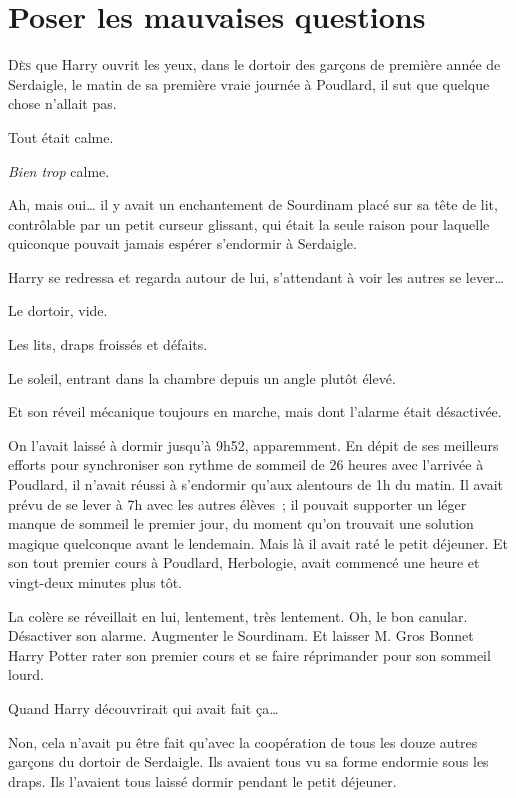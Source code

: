 
\chapter{Poser les mauvaises questions}

\lettrine{D}{ès} que Harry ouvrit les yeux, dans le dortoir des garçons de première année de Serdaigle, le matin de sa première vraie journée à Poudlard, il sut que quelque chose n'allait pas.

Tout était calme.

\emph{Bien trop} calme.

Ah, mais oui… il y avait un enchantement de Sourdinam placé sur sa tête de lit, contrôlable par un petit curseur glissant, qui était la seule raison pour laquelle quiconque pouvait jamais espérer s'endormir à Serdaigle.

Harry se redressa et regarda autour de lui, s'attendant à voir les autres se lever…

Le dortoir, vide.

Les lits, draps froissés et défaits.

Le soleil, entrant dans la chambre depuis un angle plutôt élevé.

Et son réveil mécanique toujours en marche, mais dont l'alarme était désactivée.

On l'avait laissé à dormir jusqu'à 9h52, apparemment.
En dépit de ses meilleurs efforts pour synchroniser son rythme de sommeil de 26 heures avec l'arrivée à Poudlard, il n'avait réussi à s'endormir qu'aux alentours de 1h du matin.
Il avait prévu de se lever à 7h avec les autres élèves~; il pouvait supporter un léger manque de sommeil le premier jour, du moment qu'on trouvait une solution magique quelconque avant le lendemain.
Mais là il avait raté le petit déjeuner.
Et son tout premier cours à Poudlard, Herbologie, avait commencé une heure et vingt-deux minutes plus tôt.

La colère se réveillait en lui, lentement, très lentement.
Oh, le bon canular.
Désactiver son alarme.
Augmenter le Sourdinam.
Et laisser M. Gros Bonnet Harry Potter rater son premier cours et se faire réprimander pour son sommeil lourd.

Quand Harry découvrirait qui avait fait ça…

Non, cela n'avait pu être fait qu'avec la coopération de tous les douze autres garçons du dortoir de Serdaigle.
Ils avaient tous vu sa forme endormie sous les draps.
Ils l'avaient tous laissé dormir pendant le petit déjeuner.


